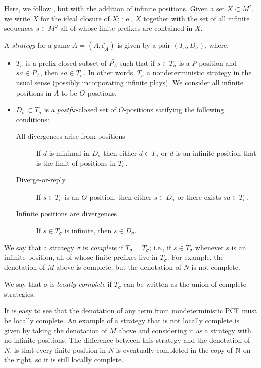 \documentclass[sigplan,10pt,review]{acmart}\settopmatter{printfolios=true,printccs=false,printacmref=false}
\begin{document}
Here, we follow \cite{mcCHFiniteND}, but with the addition of infinite positions.
Given a set $X\subset M^*$, we write $\bar{X}$ for the ideal closure of $X$; i.e., $X$ together with the set of all infinite sequences $s\in M^\omega$ all of whose finite prefixes are contained in $X$.

A \emph{strategy} for a game $A=(A,\zeta_A)$ is given by a pair $(T_\sigma, D_\sigma)$, where:
\begin{itemize}
  \item $T_\sigma$ is a prefix-closed subset of $\bar{P_A}$ such that if $s\in T_\sigma$ is a $P$-position and $sa\in P_A$, then $sa\in T_\sigma$.  
    In other words, $T_\sigma$ a nondeterministic strategy in the usual sense (possibly incorporating infinite plays).  
    We consider all infinite positions in $A$ to be $O$-positions.
  \item $D_\sigma\subset T_\sigma$ is a \emph{postfix}-closed set of $O$-positions satifying the following conditions:
    \begin{description}
      \item[All divergences arise from positions] If $d$ is minimal in $D_\sigma$ then either $d\in T_\sigma$ or $d$ is an infinite position that is the limit of positions in $T_\sigma$.
      \item[Diverge-or-reply] If $s\in T_\sigma$ is an $O$-position, then either $s\in D_\sigma$ or there exists $sa\in T_\sigma$.
      \item[Infinite positions are divergences] If $s\in T_\sigma$ is infinite, then $s\in D_\sigma$.
    \end{description}
\end{itemize}

We say that a strategy $\sigma$ is \emph{complete} if $T_\sigma=\bar{T_\sigma}$; i.e., if $s\in T_\sigma$ whenever $s$ is an infinite position, all of whose finite prefixes live in $T_\sigma$.  
For example, the denotation of $M$ above is complete, but the denotation of $N$ is not complete.  

We say that $\sigma$ is \emph{locally complete} if $T_\sigma$ can be written as the union of complete strategies.  

It is easy to see that the denotation of any term from nondeterministic PCF must be locally complete.  
An example of a strategy that is not locally complete is given by taking the denotation of $M$ above and considering it as a strategy with no infinite positions.  
The difference between this strategy and the denotation of $N$, is that every finite position in $N$ is eventually completed in the copy of $\mathbb{N}$ on the right, so it is still locally complete.
\end{document}
